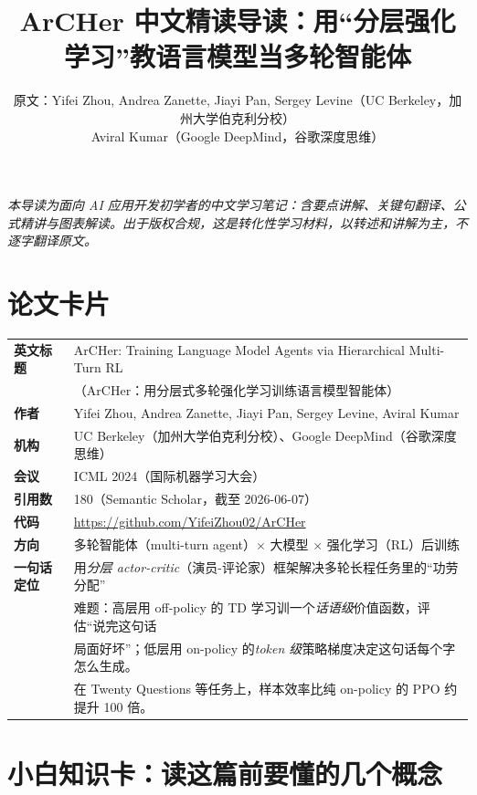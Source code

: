 \documentclass[11pt,UTF8,fontset=fandol]{ctexart}
\title{\textbf{ArCHer 中文精读导读：用“分层强化学习”教语言模型当多轮智能体}}
\author{原文：Yifei Zhou, Andrea Zanette, Jiayi Pan, Sergey Levine（UC Berkeley，加州大学伯克利分校）\\ Aviral Kumar（Google DeepMind，谷歌深度思维）}
\date{}
\begin{document}
\maketitle
\begin{center}\small\textit{本导读为面向 AI 应用开发初学者的中文学习笔记：含要点讲解、关键句翻译、公式精讲与图表解读。出于版权合规，这是转化性学习材料，以转述和讲解为主，不逐字翻译原文。}\end{center}

\section*{论文卡片}
\begin{center}
\begin{tabular}{@{}ll@{}}
\toprule
\textbf{英文标题} & ArCHer: Training Language Model Agents via Hierarchical Multi-Turn RL \\
            & （ArCHer：用分层式多轮强化学习训练语言模型智能体） \\
\textbf{作者} & Yifei Zhou, Andrea Zanette, Jiayi Pan, Sergey Levine, Aviral Kumar \\
\textbf{机构} & UC Berkeley（加州大学伯克利分校）、Google DeepMind（谷歌深度思维） \\
\textbf{会议} & ICML 2024（国际机器学习大会） \\
\textbf{引用数} & 180（Semantic Scholar，截至 2026-06-07） \\
\textbf{代码} & \url{https://github.com/YifeiZhou02/ArCHer} \\
\textbf{方向} & 多轮智能体（multi-turn agent）$\times$ 大模型 $\times$ 强化学习（RL）后训练 \\
\textbf{一句话定位} & 用\emph{分层 actor-critic}（演员-评论家）框架解决多轮长程任务里的“功劳分配”\\
              & 难题：高层用 off-policy 的 TD 学习训一个\emph{话语级}价值函数，评估“说完这句话\\
              & 局面好坏”；低层用 on-policy 的\emph{token 级}策略梯度决定这句话每个字怎么生成。\\
              & 在 Twenty Questions 等任务上，样本效率比纯 on-policy 的 PPO 约提升 100 倍。 \\
\bottomrule
\end{tabular}
\end{center}

\section{小白知识卡：读这篇前要懂的几个概念}
\end{document}
